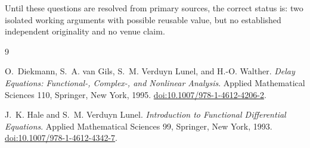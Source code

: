 Until these questions are resolved from primary sources, the correct status
is: two isolated working arguments with possible reusable value, but no
established independent originality and no venue claim.

\begin{thebibliography}{9}

O.~Diekmann, S.~A. van Gils, S.~M. Verduyn Lunel, and H.-O. Walther.
\newblock \emph{Delay Equations: Functional-, Complex-, and Nonlinear
  Analysis}.
\newblock Applied Mathematical Sciences 110, Springer, New York, 1995.
\newblock \href{https://doi.org/10.1007/978-1-4612-4206-2}
  {doi:10.1007/978-1-4612-4206-2}.

J.~K. Hale and S.~M. Verduyn Lunel.
\newblock \emph{Introduction to Functional Differential Equations}.
\newblock Applied Mathematical Sciences 99, Springer, New York, 1993.
\newblock \href{https://doi.org/10.1007/978-1-4612-4342-7}
  {doi:10.1007/978-1-4612-4342-7}.

\end{thebibliography}

